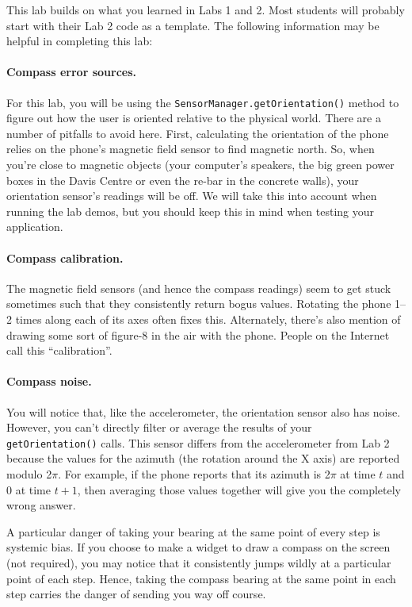 \documentclass[10pt]{article}
\begin{document}
This lab builds on what you learned in Labs 1 and 2. Most students will probably start with their Lab 2 code as a template. The following information may be helpful in completing this lab:

\paragraph{Compass error sources.}
For this lab, you will be using the {\tt SensorManager.getOrientation()} method to figure out how the user is oriented relative to the physical world. There are a number of pitfalls to avoid here. First, calculating the orientation of the phone relies on the phone's magnetic field sensor to find magnetic north. So, when you're close to magnetic objects (your computer's speakers, the big green power boxes in the Davis Centre or even the re-bar in the concrete walls), your orientation sensor's readings will be off. We will take this into account when running the lab demos, but you should keep this in mind when testing your application.

\paragraph{Compass calibration.}
The magnetic field sensors (and hence the compass readings) seem to get stuck sometimes such that they consistently return bogus values. Rotating the phone 1--2 times along each of its axes often fixes this. Alternately, there's also mention of drawing some sort of figure-8 in the air with the phone. People on the Internet call this ``calibration''.

\paragraph{Compass noise.}
You will notice that, like the accelerometer, the orientation sensor also has noise. However, you can't directly filter or average the results of your {\tt getOrientation()} calls. This sensor differs from the accelerometer from Lab 2 because the values for the azimuth (the rotation around the X axis) are reported modulo 2$\pi$. For example, if the phone reports that its azimuth is 2$\pi$ at time $t$ and 0 at time $t+1$, then averaging those values together will give you the completely wrong answer.

A particular danger of taking your bearing at the same point of every step is systemic bias. If you choose to make a widget to draw a compass on the screen (not required), you may notice that it consistently jumps wildly at a particular point of each step. Hence, taking the compass bearing at the same point in each step carries the danger of sending you way off course.
\end{document}
